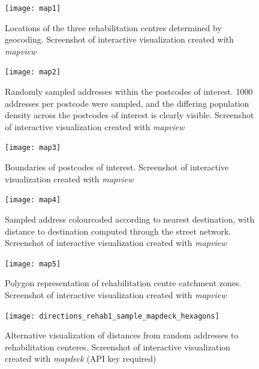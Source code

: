 \documentclass[utf8]{frontiersHLTH}
\begin{document}
\begin{figure}[h!]
\begin{center}
\texttt{[image: map1]}
\end{center}
\caption{Locations of the three rehabilitation centres determined by geocoding. Screenshot of interactive visualization created with {\em mapview}}\label{fig:RehabCenterLocations}
\end{figure}

\begin{figure}[h!]
\begin{center}
\texttt{[image: map2]}
\end{center}
\caption{Randomly sampled addresses within the postcodes of interest. 1000 addresses per postcode were sampled, and the differing population density across the postcodes of interest is clearly visible. Screenshot of interactive visualization created with {\em mapview}}\label{fig:RehabCenterRandomAddresses}
\end{figure}

\begin{figure}[h!]
\begin{center}
\texttt{[image: map3]}
\end{center}
\caption{Boundaries of postcodes of interest. Screenshot of interactive visualization created with {\em mapview}}\label{fig:RehabCenterPostcodes}
\end{figure}

\begin{figure}[h!]
\begin{center}
\texttt{[image: map4]}
\end{center}
\caption{Sampled address colourcoded according to nearest destination, with distance to destination computed through the street network. Screenshot of interactive visualization created with {\em mapview}}\label{fig:RehabCenterAddressCatchments}
\end{figure}

\begin{figure}[h!]
\begin{center}
\texttt{[image: map5]}
\end{center}
\caption{Polygon representation of rehabilitation centre catchment zones. Screenshot of interactive visualization created with {\em mapview}}\label{fig:RehabCenterAddressCatchments}
\end{figure}

\begin{figure}[h!]
\begin{center}
\texttt{[image: directions\_rehab1\_sample\_mapdeck\_hexagons]}
\end{center}
\caption{Alternative visualization of distances from random addresses to rehabilitation centeres. Screenshot of interactive visualization created with {\em mapdeck} (API key required)}\label{fig:RehabCenterAddressDistanceHex}
\end{figure}
\end{document}
